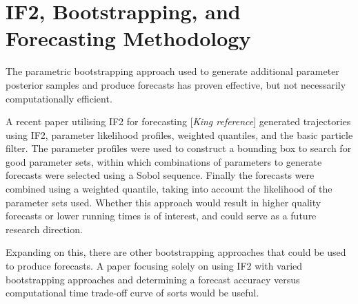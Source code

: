 \section{IF2, Bootstrapping, and Forecasting Methodology}

	The parametric bootstrapping approach used to generate additional parameter posterior samples and produce forecasts has proven effective, but not necessarily computationally efficient.

	A recent paper utilising IF2 for forecasting [\textit{King reference}] generated trajectories using IF2, parameter likelihood profiles, weighted quantiles, and the basic particle filter. The parameter profiles were used to construct a bounding box to search for good parameter sets, within which combinations of parameters to generate forecasts were selected using a Sobol sequence. Finally the forecasts were combined using a weighted quantile, taking into account the likelihood of the parameter sets used. Whether this approach would result in higher quality forecasts or lower running times is of interest, and could serve as a future research direction. 

	Expanding on this, there are other bootstrapping approaches that could be used to produce forecasts. A paper focusing solely on using IF2 with varied bootstrapping approaches and determining a forecast accuracy versus computational time trade-off curve of sorts would be useful.